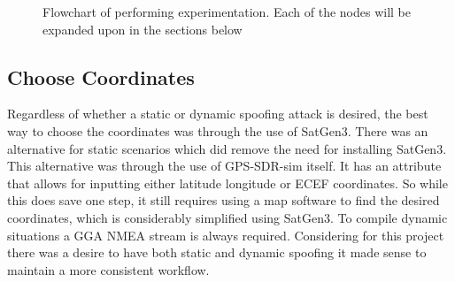 \begin{figure}[H]
    \begin{center}
    \end{center}
    \caption{Flowchart of performing experimentation. Each of the nodes will be expanded upon in the sections below} \label{fig:Flowchart}
\end{figure}

\subsection{Choose Coordinates} \label{subsec:coordinate}
Regardless of whether a static or dynamic spoofing attack is desired, the best way to choose the coordinates was through the use of SatGen3. There was an alternative for
static scenarios which did remove the need for installing SatGen3. This alternative was through the use of GPS-SDR-sim itself. It has an attribute that allows for
inputting either latitude longitude or ECEF coordinates. So while this does save one step, it still requires using a map software to find the desired coordinates, which
is considerably simplified using SatGen3. To compile dynamic situations a GGA NMEA stream is always required. Considering for this project there was a desire to have both static and dynamic spoofing it made sense
to maintain a more consistent workflow.

